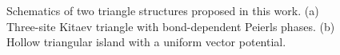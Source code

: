 \documentclass[aps,prb,twocolumn,showpacs,amsmath,amssymb,superscriptaddress]{revtex4-2}
\begin{document}
\begin{figure}[ht]
  \hspace{-18pt}
  \caption{Schematics of two triangle structures proposed in this work. (a) Three-site Kitaev triangle with bond-dependent Peierls phases. (b) Hollow triangular island with a uniform vector potential.}
  \label{fig:triangles}
\end{figure}
\end{document}
